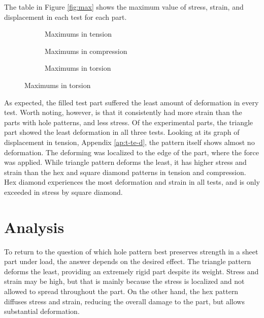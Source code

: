 \documentclass[12pt, letterpaper]{article}
\begin{document}
The table in Figure \ref{fig:max} shows the maximum value of stress, strain, and displacement in each test for each part. 

\begin{figure}[H]
	\centering
	\caption{Maximum values reached for displacement, stress, and strain, per test and part}
	\label{fig:max}
	\begin{subfigure}[b]{0.8\linewidth}
	\label{tab:tension}
	\caption{Maximums in tension}
	\end{subfigure}
	\begin{subfigure}[b]{0.8\linewidth}
	\label{tab:compression}
	\caption{Maximums in compression}
	\end{subfigure}
	\begin{subfigure}[b]{0.8\linewidth}
	\label{tab:torsion}
	\caption{Maximums in torsion}
	\end{subfigure}
\end{figure}

As expected, the filled test part suffered the least amount of deformation in every test. Worth noting, however, is that it consistently had more strain than the parts with hole patterns, and less stress. 
Of the experimental parts, the triangle part showed the least deformation in all three tests. Looking at its graph of displacement in tension, Appendix \ref{ap:t-te-d}, the pattern itself shows almost no deformation. The deforming was localized to the edge of the part, where the force was applied. While triangle pattern deforms the least, it has higher stress and strain than the hex and square diamond patterns in tension and compression.
Hex diamond experiences the most deformation and strain in all tests, and is only exceeded in stress by square diamond. 


\section{Analysis}
\label{sec:analysis}

To return to the question of which hole pattern best preserves strength in a sheet part under load, the answer depends on the desired effect. The triangle pattern deforms the least, providing an extremely rigid part despite its weight. Stress and strain may be high, but that is mainly because the stress is localized and not allowed to spread throughout the part. On the other hand, the hex pattern diffuses stress and strain, reducing the overall damage to the part, but allows substantial deformation. 
\end{document}
